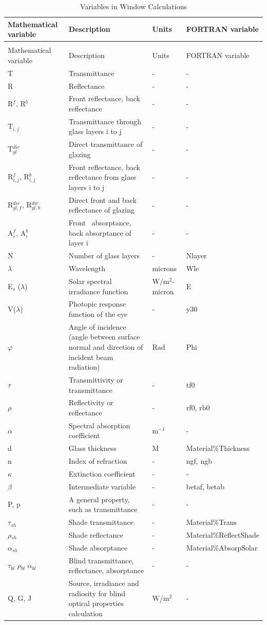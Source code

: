 \begin{longtable}[c]{p{1.0in}p{2.5in}p{1.0in}p{1.5in}}
\caption{Variables in Window Calculations \label{table:variables-in-window-calculations}} \tabularnewline
\toprule 
Mathematical variable & Description & Units & FORTRAN variable \tabularnewline \midrule
\endfirsthead

\caption[]{Variables in Window Calculations} \tabularnewline
\toprule 
Mathematical variable & Description & Units & FORTRAN variable \tabularnewline \midrule
\endhead

T & Transmittance & - & - \tabularnewline
R & Reflectance & - & - \tabularnewline
R\(^{f}\), R\(^{b}\) & Front reflectance, back reflectance & - & - \tabularnewline
T\(_{i,j}\) & Transmittance through glass layers i to j & - & - \tabularnewline
T\(^{dir}_{gl}\) & Direct transmittance of glazing & - & - \tabularnewline
R\(^{f}_{i,j}\), R\(^{b}_{i,j}\) & Front reflectance, back reflectance from glass layers i to j & - & - \tabularnewline
R\(^{dir}_{gl,f}\), R\(^{dir}_{gl,b}\) & Direct front and back reflectance of glazing & - & - \tabularnewline
A\(^{f}_{i}\), A\(^{b}_{i}\) & Front~ absorptance, back absorptance of layer i & - & - \tabularnewline
N & Number of glass layers & - & Nlayer \tabularnewline
$\lambda$ & Wavelength & microns & Wle \tabularnewline
E\(_{s}\) ($\lambda$) & Solar spectral irradiance function & W/m\(^{2}\)-micron & E \tabularnewline
V($\lambda$) & Photopic response function of the eye & - & y30 \tabularnewline
$\varphi$ & Angle of incidence (angle between surface normal and direction of incident beam radiation) & Rad & Phi \tabularnewline
$\tau$ & Transmittivity or transmittance & - & tf0 \tabularnewline
$\rho$ & Reflectivity or reflectance & - & rf0, rb0 \tabularnewline
$\alpha$ & Spectral absorption coefficient & m\(^{-1}\) & - \tabularnewline
d & Glass thickness & M & Material\%Thickness \tabularnewline
n & Index of refraction & - & ngf, ngb \tabularnewline
$\kappa$ & Extinction coefficient & - & - \tabularnewline
$\beta$ & Intermediate variable & - & betaf, betab \tabularnewline
P, p & A general property, such as transmittance & - & - \tabularnewline
$\tau$\(_{sh}\) & Shade transmittance & - & Material\%Trans \tabularnewline
$\rho$\(_{sh}\) & Shade reflectance & - & Material\%ReflectShade \tabularnewline
$\alpha$\(_{sh}\) & Shade absorptance & - & Material\%AbsorpSolar \tabularnewline
$\tau$\(_{bl}\) $\rho$\(_{bl}\) $\alpha$\(_{bl}\) & Blind transmittance, reflectance, absorptance & - & - \tabularnewline
Q, G, J & Source, irradiance and radiosity for blind optical properties calculation & W/m\(^{2}\) & - \tabularnewline

\end{longtable}
